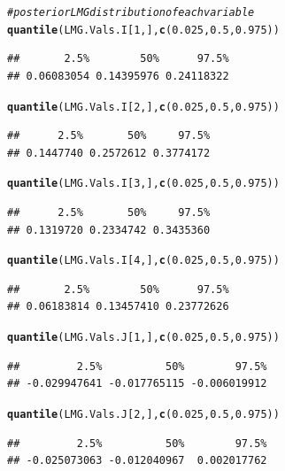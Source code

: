 \documentclass[11pt,a4paper,twoside]{book}
\makeatletter
\newcommand{\hlnum}[1]{\textcolor[rgb]{0.686,0.059,0.569}{#1}}%
\newcommand{\hlcom}[1]{\textcolor[rgb]{0.678,0.584,0.686}{\textit{#1}}}%
\newcommand{\hlstd}[1]{\textcolor[rgb]{0.345,0.345,0.345}{#1}}%
\newcommand{\hlkwd}[1]{\textcolor[rgb]{0.737,0.353,0.396}{\textbf{#1}}}%
\newenvironment{kframe}{%
 \def\at@end@of@kframe{}%
 \ifinner\ifhmode%
  \def\at@end@of@kframe{\end{minipage}}%
  \begin{minipage}{\columnwidth}%
 \fi\fi%
 \def\FrameCommand##1{\hskip\@totalleftmargin \hskip-\fboxsep
 \colorbox{shadecolor}{##1}\hskip-\fboxsep
     \hskip-\linewidth \hskip-\@totalleftmargin \hskip\columnwidth}%
 \MakeFramed {\advance\hsize-\width
   \@totalleftmargin\z@ \linewidth\hsize
   \@setminipage}}%
 {\par\unskip\endMakeFramed%
 \at@end@of@kframe}
\newenvironment{knitrout}{}{} %
\makeatother
\begin{document}
\begin{knitrout}
\begin{kframe}
\begin{alltt}
\hlcom{# posterior LMG distribution of each variable}
\hlkwd{quantile}\hlstd{(LMG.Vals.I[}\hlnum{1}\hlstd{,],} \hlkwd{c}\hlstd{(}\hlnum{0.025}\hlstd{,} \hlnum{0.5}\hlstd{,} \hlnum{0.975}\hlstd{))}
\end{alltt}
\begin{verbatim}
##       2.5%        50%      97.5% 
## 0.06083054 0.14395976 0.24118322
\end{verbatim}
\begin{alltt}
\hlkwd{quantile}\hlstd{(LMG.Vals.I[}\hlnum{2}\hlstd{,],} \hlkwd{c}\hlstd{(}\hlnum{0.025}\hlstd{,} \hlnum{0.5}\hlstd{,} \hlnum{0.975}\hlstd{))}
\end{alltt}
\begin{verbatim}
##      2.5%       50%     97.5% 
## 0.1447740 0.2572612 0.3774172
\end{verbatim}
\begin{alltt}
\hlkwd{quantile}\hlstd{(LMG.Vals.I[}\hlnum{3}\hlstd{,],} \hlkwd{c}\hlstd{(}\hlnum{0.025}\hlstd{,} \hlnum{0.5}\hlstd{,} \hlnum{0.975}\hlstd{))}
\end{alltt}
\begin{verbatim}
##      2.5%       50%     97.5% 
## 0.1319720 0.2334742 0.3435360
\end{verbatim}
\begin{alltt}
\hlkwd{quantile}\hlstd{(LMG.Vals.I[}\hlnum{4}\hlstd{,],} \hlkwd{c}\hlstd{(}\hlnum{0.025}\hlstd{,} \hlnum{0.5}\hlstd{,} \hlnum{0.975}\hlstd{))}
\end{alltt}
\begin{verbatim}
##       2.5%        50%      97.5% 
## 0.06183814 0.13457410 0.23772626
\end{verbatim}
\begin{alltt}
\hlkwd{quantile}\hlstd{(LMG.Vals.J[}\hlnum{1}\hlstd{,],} \hlkwd{c}\hlstd{(}\hlnum{0.025}\hlstd{,} \hlnum{0.5}\hlstd{,} \hlnum{0.975}\hlstd{))}
\end{alltt}
\begin{verbatim}
##         2.5%          50%        97.5% 
## -0.029947641 -0.017765115 -0.006019912
\end{verbatim}
\begin{alltt}
\hlkwd{quantile}\hlstd{(LMG.Vals.J[}\hlnum{2}\hlstd{,],} \hlkwd{c}\hlstd{(}\hlnum{0.025}\hlstd{,} \hlnum{0.5}\hlstd{,} \hlnum{0.975}\hlstd{))}
\end{alltt}
\begin{verbatim}
##         2.5%          50%        97.5% 
## -0.025073063 -0.012040967  0.002017762
\end{verbatim}

\end{kframe}
\end{knitrout}
\end{document}
